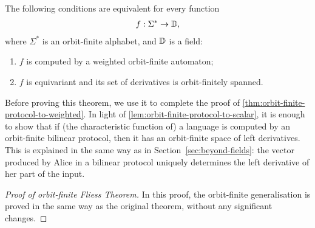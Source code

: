 \begin{theorem}
\begin{theorem}\label{thm:orbit-finite-fliess}
    The following conditions are equivalent for every  function
    \begin{align*}
    f : \Sigma^* \to \mathbb D,
    \end{align*}
    where $\Sigma^*$ is an orbit-finite alphabet, and $\mathbb D$ is a field: 
    \begin{enumerate}
        \item \label{it:fliess-weighted} $f$ is computed by a weighted orbit-finite automaton;
        \item \label{it:fliess-derivatives} $f$ is equivariant and its set of derivatives is orbit-finitely spanned.
    \end{enumerate}
\end{theorem}

Before proving this theorem, we use it to complete the proof of \cref{thm:orbit-finite-protocol-to-weighted}. In light of  \cref{lem:orbit-finite-protocol-to-scalar}, it is enough to show that if (the characteristic function of) a  language is computed by an orbit-finite bilinear protocol, then it has  an orbit-finite space of left derivatives. This is explained in the same way as in Section~\ref{sec:beyond-fields}: the vector produced by Alice in a bilinear protocol uniquely determines the left derivative of her part of the input. 

\begin{proof}[Proof of orbit-finite Fliess Theorem] In this proof, the orbit-finite generalisation is proved in the same way as the original theorem, without any significant changes.


\end{proof}
\end{theorem}
